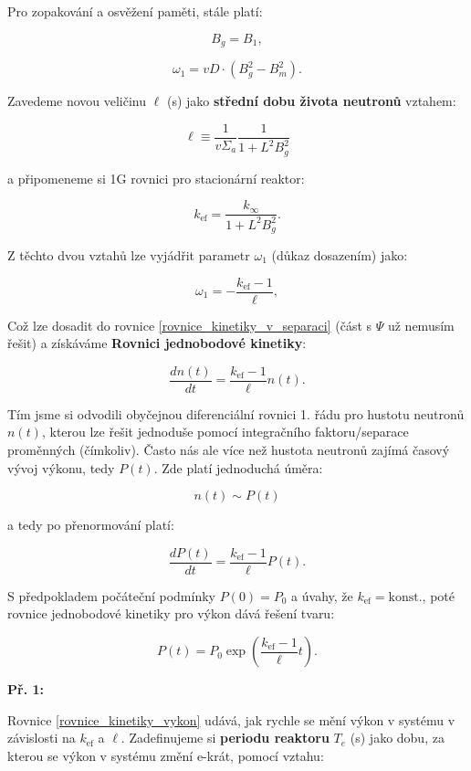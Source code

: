 Pro zopakování a osvěžení paměti, stále platí:

$$ B_g = B_1, $$

$$ \omega_1 = vD \cdot (B_g^2 - B_m^2). $$

Zavedeme novou veličinu $\ell$ (s) jako \textbf{střední dobu života neutronů} vztahem:

\begin{equation}
  \boxed{
  \ell \equiv \dfrac{1}{v \Sigma_a} \dfrac{1}{1+L^2B_g^2}
  \label{stredni_doba_zivota}}
\end{equation}

a připomeneme si 1G rovnici pro stacionární reaktor:

$$ k_{\text{ef}} = \dfrac{k_{\infty}}{1 + L^2 B_g^2}. $$

Z těchto dvou vztahů lze vyjádřit parametr $\omega_1$ (důkaz dosazením) jako:

$$ \omega_1 = -\dfrac{k_{\text{ef}} - 1}{\ell}, $$

Což lze dosadit do rovnice \eqref{rovnice_kinetiky_v_separaci} (část s $\Psi$ už nemusím řešit) a získáváme \textbf{Rovnici jednobodové kinetiky}:

\begin{equation}
  \boxed{
  \dfrac{dn(t)}{dt} = \dfrac{k_{\text{ef}} - 1}{\ell} n(t).
  \label{rovnice_kinetiky_reseni}}
\end{equation}

Tím jsme si odvodili obyčejnou diferenciální rovnici 1. řádu pro hustotu neutronů $n(t)$, kterou lze řešit jednoduše pomocí integračního faktoru/separace proměnných (čímkoliv). Často nás ale více než hustota neutronů zajímá časový vývoj výkonu, tedy $P(t)$. Zde platí jednoduchá úměra:

$$ n(t) \sim P(t) $$

a tedy po přenormování platí:

$$ \dfrac{dP(t)}{dt} = \dfrac{k_{\text{ef}} - 1}{\ell} P(t). $$

S předpokladem počáteční podmínky $P(0) = P_0$ a úvahy, že $k_{\text{ef}} = \text{konst.}$, poté rovnice jednobodové kinetiky pro výkon dává řešení tvaru:

\begin{equation}
  P(t) = P_0 \exp \left ( \dfrac{k_{\text{ef}} - 1}{\ell} t \right ).
  \label{rovnice_kinetiky_vykon}
\end{equation}

\textbf{Př. 1:}

Rovnice \eqref{rovnice_kinetiky_vykon} udává, jak rychle se mění výkon v systému v závislosti na $k_{\text{ef}}$ a $\ell$. Zadefinujeme si \textbf{periodu reaktoru} $T_e$ (s) jako dobu, za kterou se výkon v systému změní e-krát, pomocí vztahu:


